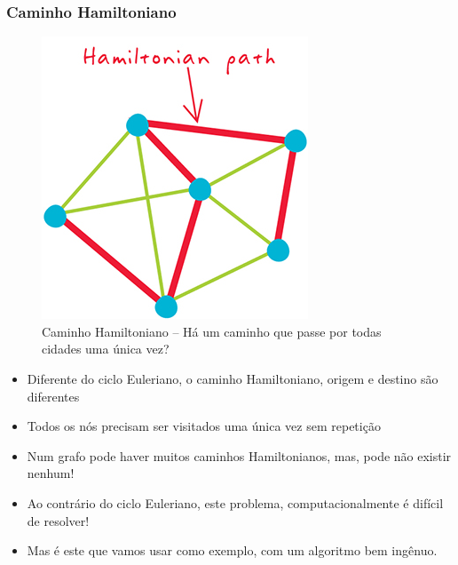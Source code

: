 \begin{frame}[fragile, allowframebreaks=0.9]
  \frametitle{Caminho Hamiltoniano}


\begin{figure}[!htb]
\centering
\includegraphics[width=.6\textwidth, height=0.60\textheight]{figures/hamiltonian_path.jpg}
\caption{Caminho Hamiltoniano -- Há um caminho que passe por todas cidades uma única vez?}
\end{figure}


\framebreak

\begin{itemize}
  \item Diferente do ciclo Euleriano, o caminho Hamiltoniano, origem
  e destino são diferentes
 
\item Todos os nós precisam ser visitados uma única vez sem repetição

\item  Num grafo pode haver muitos caminhos  Hamiltonianos, mas, pode
não existir nenhum!

\item Ao contrário do ciclo Euleriano, este problema, computacionalmente é difícil de resolver!

\item Mas é este que vamos usar como exemplo, com um algoritmo 
bem ingênuo.
\end{itemize}

\end{frame}


